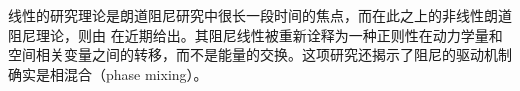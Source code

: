 线性的研究理论是朗道阻尼研究中很长一段时间的焦点，而在此之上的非线性朗道阻尼理论，则由 \cite*{mouhot2011} 在近期给出。其阻尼线性被重新诠释为一种正则性在动力学量和空间相关变量之间的转移，而不是能量的交换。这项研究还揭示了阻尼的驱动机制确实是相混合（phase mixing）。







